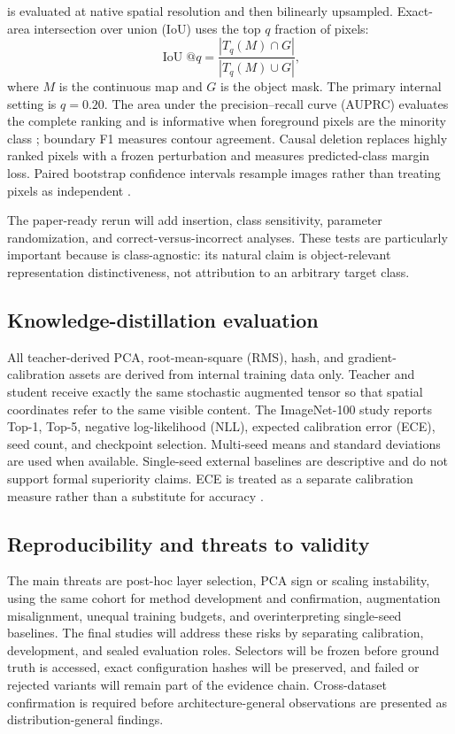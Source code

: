 \methodname{} is evaluated at native spatial resolution and then bilinearly
upsampled. Exact-area intersection over union (IoU) uses the top $q$ fraction
of pixels:
\begin{equation}
    \operatorname{IoU}@q
    =\frac{|T_q(M)\cap G|}{|T_q(M)\cup G|},
\end{equation}
where $M$ is the continuous map and $G$ is the object mask. The primary
internal setting is $q=0.20$. The area under the precision--recall curve
(AUPRC) evaluates the complete ranking and is
informative when foreground pixels are the minority class
\cite{davis2006prroc,saito2015precisionrecall}; boundary F1 measures contour
agreement. Causal deletion replaces highly ranked pixels
with a frozen perturbation and measures predicted-class margin loss. Paired
bootstrap confidence intervals resample images rather than treating pixels as
independent \cite{efron1993bootstrap}.

The paper-ready rerun will add insertion, class sensitivity, parameter
randomization, and correct-versus-incorrect analyses. These tests are
particularly important because \methodname{} is class-agnostic: its natural claim is
object-relevant representation distinctiveness, not attribution to an arbitrary
target class.

\subsection{Knowledge-distillation evaluation}

All teacher-derived PCA, root-mean-square (RMS), hash, and gradient-calibration
assets are derived from internal training data only. Teacher and student receive exactly the same
stochastic augmented tensor so that spatial coordinates refer to the same
visible content. The ImageNet-100 study reports Top-1, Top-5, negative
log-likelihood (NLL), expected calibration error (ECE), seed count, and
checkpoint selection. Multi-seed means and standard deviations are used when
available. Single-seed external baselines are descriptive and do not support
formal superiority claims. ECE is treated as a separate calibration measure
rather than a substitute for accuracy \cite{guo2017calibration}.

\subsection{Reproducibility and threats to validity}

The main threats are post-hoc layer selection, PCA sign or scaling instability,
using the same cohort for method development and confirmation, augmentation
misalignment, unequal training budgets, and overinterpreting single-seed
baselines. The final studies will address these risks by separating calibration,
development, and sealed evaluation roles. Selectors will be frozen before
ground truth is accessed, exact configuration hashes will be preserved, and
failed or rejected variants will remain part of the evidence chain. Cross-dataset confirmation is
required before architecture-general observations are presented as
distribution-general findings.
